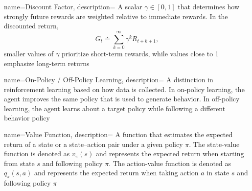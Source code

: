 {
    name={Discount Factor},
    description={
    A scalar $\gamma \in [0,1]$ that determines how strongly future rewards are weighted relative to immediate rewards. 
    In the discounted return,
    \[
    G_t \doteq \sum_{k=0}^{\infty} \gamma^k R_{t+k+1},
    \]
    smaller values of $\gamma$ prioritize short-term rewards, while values close to 1 emphasize long-term returns \cite{sutton2018reinforcement}
    }
}

{
    name={On-Policy / Off-Policy Learning},
    description={
    A distinction in reinforcement learning based on how data is collected. 
    In on-policy learning, the agent improves the same policy that is used 
    to generate behavior. In off-policy learning, the agent learns about a 
    target policy while following a different behavior policy 
    \cite{sutton2018reinforcement}
    }
}

{
    name={Value Function},
    description={
    A function that estimates the expected return of a state or a state--action pair 
    under a given policy $\pi$. The state-value function is denoted as 
    $v_\pi(s)$ and represents the expected return when starting from state $s$ 
    and following policy $\pi$. The action-value function is denoted as 
    $q_\pi(s,a)$ and represents the expected return when taking action $a$ 
    in state $s$ and following policy $\pi$ 
    \cite{sutton2018reinforcement}
    }
}